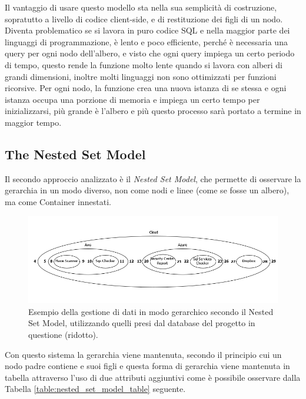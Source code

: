 \hfill\break
Il vantaggio di usare questo modello sta nella sua semplicità di costruzione, sopratutto a livello di codice client-side, 
e di restituzione dei figli di un nodo. Diventa problematico se si lavora in puro codice SQL e nella maggior parte dei linguaggi 
di programmazione, è lento e poco efficiente, perché è necessaria una query per ogni nodo dell'albero, e visto che ogni query impiega 
un certo periodo di tempo, questo rende la funzione molto lente quando si lavora con alberi di grandi dimensioni, inoltre molti linguaggi 
non sono ottimizzati per funzioni ricorsive. Per ogni nodo, la funzione crea una nuova istanza di se stessa e ogni istanza occupa 
una porzione di memoria e impiega un certo tempo per inizializzarsi, più grande è l'albero e più questo processo sarà portato a termine 
in maggior tempo.
%
\subsection{The Nested Set Model}
Il secondo approccio analizzato è il \textit{Nested Set Model}, che permette di osservare la gerarchia in un modo diverso, non 
come nodi e linee (come se fosse un albero), ma come Container innestati.
%
\begin{figure}[ht!]
    \includegraphics[scale=0.66]{images/MC_Rec_NSM_Container(R).png}
    \caption{Esempio della gestione di dati in modo gerarchico secondo il Nested Set Model, utilizzando quelli presi dal database del 
    progetto in questione (ridotto).}
    \label{fig:MC_Rec_NSM_Container_R}
\end{figure}
%
Con questo sistema la gerarchia viene mantenuta, secondo il principio cui un nodo padre contiene e suoi figli e questa forma di 
gerarchia viene mantenuta in tabella attraverso l'uso di due attributi aggiuntivi come è possibile osservare dalla Tabella 
\ref{table:nested_set_model_table} seguente.
